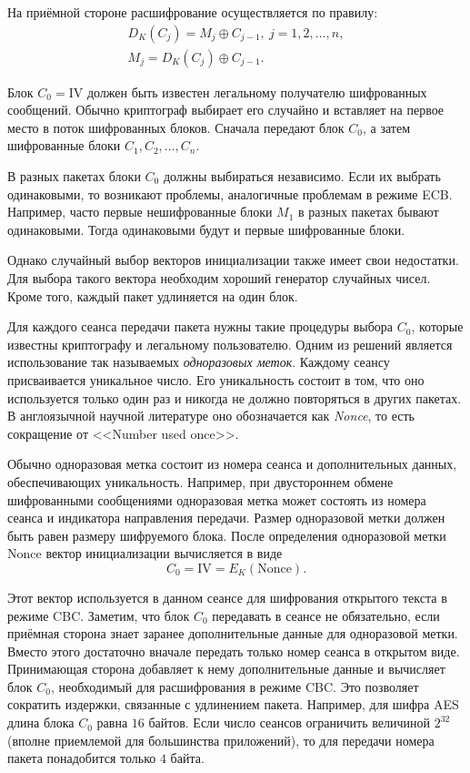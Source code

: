 На приёмной стороне расшифрование осуществляется по правилу:
\[ \begin{array}{l}
    D_K(C_j) = M_j \oplus C_{j-1}, ~ j=1, 2, \dots, n,\\
    M_{j} = D_K(C_j) \oplus C_{j-1}.
\end{array} \]

Блок $C_0 = \textrm{IV}$ должен быть известен легальному получателю шифрованных сообщений. Обычно криптограф выбирает его случайно и вставляет на первое место в поток шифрованных блоков. Сначала передают блок $C_0$, а затем шифрованные блоки $C_1, C_2, \ldots, C_n$.

В разных пакетах блоки $C_0$ должны выбираться независимо. Если их выбрать одинаковыми, то возникают проблемы, аналогичные проблемам в режиме ECB. Например, часто первые нешифрованные блоки $M_1$ в разных пакетах бывают одинаковыми. Тогда одинаковыми будут и первые шифрованные блоки.

Однако случайный выбор векторов инициализации также имеет свои недостатки. Для выбора такого вектора необходим хороший генератор случайных чисел. Кроме того, каждый пакет удлиняется на один блок.

Для каждого сеанса передачи пакета нужны такие процедуры выбора $C_0$, которые известны криптографу и легальному пользователю. Одним из решений является использование так называемых \emph{одноразовых меток}. Каждому сеансу присваивается уникальное число. Его уникальность состоит в том, что оно используется только один раз и никогда не должно повторяться в других пакетах. В англоязычной научной литературе оно обозначается как \emph{Nonce}, то есть сокращение от <<Number used once>>.

Обычно одноразовая метка состоит из номера сеанса и дополнительных данных, обеспечивающих уникальность. Например, при двустороннем обмене шифрованными сообщениями одноразовая метка может состоять из номера сеанса и индикатора направления передачи. Размер одноразовой метки должен быть равен размеру шифруемого блока. После определения одноразовой метки $\textrm{Nonce}$ вектор инициализации вычисляется в виде
    \[ C_0 = \textrm{IV} = E_K(\textrm{Nonce}). \]

Этот вектор используется в данном сеансе для шифрования открытого текста в режиме CBC. Заметим, что блок $C_0$ передавать в сеансе не обязательно, если приёмная сторона знает заранее дополнительные данные для одноразовой метки. Вместо этого достаточно вначале передать только номер сеанса в открытом виде. Принимающая сторона добавляет к нему дополнительные данные и вычисляет блок $C_0$, необходимый для расшифрования в режиме CBC. Это позволяет сократить издержки, связанные с удлинением пакета. Например, для шифра AES длина блока $C_0$ равна $16$ байтов. Если число сеансов ограничить величиной $2^{32}$ (вполне приемлемой для большинства приложений), то для передачи номера пакета понадобится только $4$ байта.


